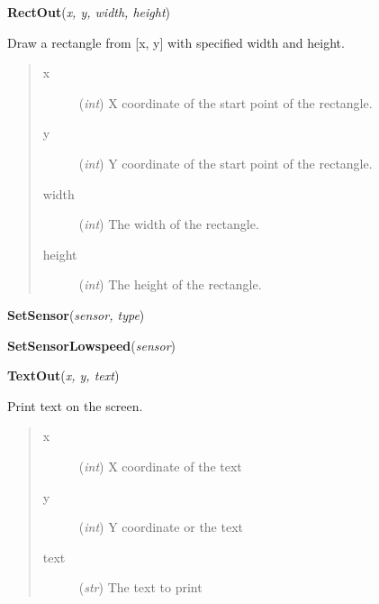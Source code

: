 \documentclass[10pt,a4paper]{article}
\begin{document}
 

\vspace{6pt}
{\bf RectOut}({\it x, y, width, height}) 
    
    Draw a rectangle from [x, y] with specified width and height.








\begin{quote}
    \begin{description}
        
\item[x] ({\emph{int}}) X coordinate of the start point of the rectangle.

\item[y] ({\emph{int}}) Y coordinate of the start point of the rectangle.

\item[width] ({\emph{int}}) The width of the rectangle.

\item[height] ({\emph{int}}) The height of the rectangle.

    \end{description}
\end{quote}

 

\vspace{6pt}
{\bf SetSensor}({\it sensor, type}) 

 

\vspace{6pt}
{\bf SetSensorLowspeed}({\it sensor}) 

 

\vspace{6pt}
{\bf TextOut}({\it x, y, text}) 
    
    Print text on the screen.
    






\begin{quote}
    \begin{description}
        
\item[x] ({\emph{int}}) X coordinate of the text

\item[y] ({\emph{int}}) Y coordinate or the text

\item[text] ({\emph{str}}) The text to print

    \end{description}
\end{quote}
\end{document}
